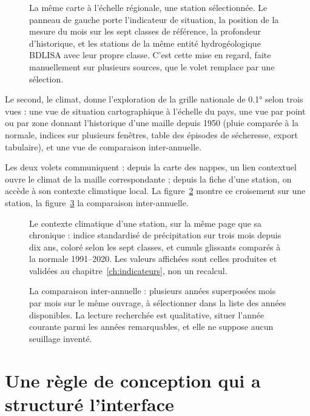 \begin{figure}[htbp]
\centering
{}
\caption{La même carte à l'échelle régionale, une station sélectionnée. Le panneau de gauche
porte l'indicateur de situation, la position de la mesure du mois sur les sept classes de
référence, la profondeur d'historique, et les stations de la même entité hydrogéologique BDLISA
avec leur propre classe. C'est cette mise en regard, faite manuellement sur plusieurs sources,
que le volet remplace par une sélection. \lecas}
\label{fig:obs-station}
\end{figure}

Le second, le climat, donne l'exploration de la grille nationale de \ang{0.1} selon trois
vues : une vue de
situation cartographique à l'échelle du pays, une vue par point ou par zone donnant l'historique
d'une maille depuis 1950 (pluie comparée à la normale, indices sur plusieurs fenêtres, table des
épisodes de sécheresse, export tabulaire), et une vue de comparaison inter-annuelle.

Les deux volets communiquent : depuis la carte des nappes, un lien contextuel ouvre le climat de
la maille correspondante ; depuis la fiche d'une station, on accède à son contexte climatique
local. La figure~\ref{fig:obs-climat} montre ce croisement sur une station, la
figure~\ref{fig:obs-comparaison} la comparaison inter-annuelle.

\begin{figure}[htbp]
\centering
{}
\caption{Le contexte climatique d'une station, sur la même page que sa chronique : indice
standardisé de précipitation sur trois mois depuis dix ans, coloré selon les sept classes, et
cumuls glissants comparés à la normale 1991--2020. Les valeurs affichées sont celles produites et
validées au chapitre~\ref{ch:indicateurs}, non un recalcul.}
\label{fig:obs-climat}
\end{figure}

\begin{figure}[htbp]
\centering
{}
\caption{La comparaison inter-annuelle : plusieurs années superposées mois par mois sur le même
ouvrage, à sélectionner dans la liste des années disponibles. La lecture recherchée est
qualitative, situer l'année courante parmi les années remarquables, et elle ne suppose aucun
seuillage inventé.}
\label{fig:obs-comparaison}
\end{figure}

\section{Une règle de conception qui a structuré l'interface}

